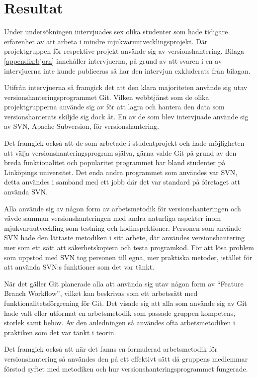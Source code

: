 \section{Resultat}
Under undersökningen intervjuades sex olika studenter som hade tidigare erfarenhet av att arbeta i mindre mjukvaruutvecklingsprojekt. Där projektgruppen för respektive projekt använde sig av versionshantering. Bilaga \ref{appendix:bjorn} innehåller intervjuerna, på grund av att svaren i en av intervjuerna inte kunde publiceras så har den intervjun exkluderats från bilagan.

Utifrån intervjuerna så framgick det att den klara majoriteten använde sig utav versionshanteringsprogrammet Git. Vilken webbtjänst som de olika projektgrupperna använde sig av för att lagra och hantera den data som versionshanterats skiljde sig dock åt. En av de som blev intervjuade använde sig av SVN, Apache Subversion, för versionshantering.\cite{VersionControlSvn}

Det framgick också att de som arbetade i studentprojekt och hade möjligheten att välja versionshanteringsprogram själva, gärna valde Git på grund av den breda funktionalitet och popularitet programmet har bland studenter på Linköpings universitet. Det enda andra programmet som användes var SVN, detta användes i samband med ett jobb där det var standard på företaget att använda SVN.

Alla använde sig av någon form av arbetsmetodik för versionshanteringen och vävde samman versionshanteringen med andra naturliga aspekter inom mjukvaruutveckling som testning och kodinspektioner. Personen som använde SVN hade den lättaste metodiken i sitt arbete, där användes versionshantering mer som ett sätt att säkerhetskopiera och testa programkod. För att lösa problem som uppstod med SVN tog personen till egna, mer praktiska metoder, istället för att använda SVN:s funktioner som det var tänkt.

 När det gäller Git planerade alla att använda sig utav någon form av ``Feature Branch Workflow'', vilket kan beskrivas som ett arbetssätt med funktionalitetsförgrening för Git. Det visade sig att alla som använde sig av Git hade valt eller utformat en arbetsmetodik som passade gruppen kompetens, storlek samt behov. Av den anledningen så användes ofta arbetsmetodiken i praktiken som det var tänkt i teorin.

 Det framgick också att när det fanns en formulerad arbetsmetodik för versionshantering så användes den på ett effektivt sätt då gruppens medlemmar förstod syftet med metodiken och hur versionshanteringsprogrammet fungerade.

